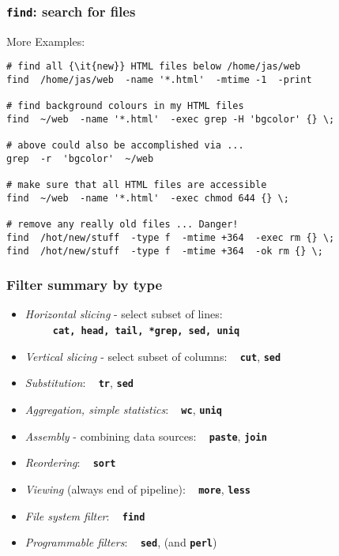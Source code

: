 \begin{frame}[fragile]
\frametitle{\textbf{\tt{find}}: search for files}
More Examples:
\begin{verbatim}
# find all {\it{new}} HTML files below /home/jas/web
find  /home/jas/web  -name '*.html'  -mtime -1  -print

# find background colours in my HTML files
find  ~/web  -name '*.html'  -exec grep -H 'bgcolor' {} \;

# above could also be accomplished via ...
grep  -r  'bgcolor'  ~/web

# make sure that all HTML files are accessible
find  ~/web  -name '*.html'  -exec chmod 644 {} \;

# remove any really old files ... Danger!
find  /hot/new/stuff  -type f  -mtime +364  -exec rm {} \;
find  /hot/new/stuff  -type f  -mtime +364  -ok rm {} \;
\end{verbatim}

\end{frame}

\begin{frame}[shrink]
\frametitle{Filter summary by type}
\begin{itemize}
\item {\em{Horizontal slicing}} - select subset of lines: \\
	~ ~ ~ \textbf{\tt{cat, head, tail, *grep, sed, uniq}}
\item {\em{Vertical slicing}} - select subset of columns:
	~ \textbf{\tt{cut}}, \textbf{\tt{sed}}
\item {\em{Substitution}}:
	~ \textbf{\tt{tr}}, \textbf{\tt{sed}} 
\item {\em{Aggregation, simple statistics}}:
	~ \textbf{\tt{wc}}, \textbf{\tt{uniq}} 
\item {\em{Assembly}} - combining data sources:
	~ \textbf{\tt{paste}}, \textbf{\tt{join}} 
\item {\em{Reordering}}:
	~ \textbf{\tt{sort}} 
\item {\em{Viewing}} (always end of pipeline):
	~ \textbf{\tt{more}}, \textbf{\tt{less}} 
\item {\em{File system filter}}:
	~ \textbf{\tt{find}} 
\item {\em{Programmable filters}}:
	~ \textbf{\tt{sed}}, (and \textbf{\tt{perl}})
\end{itemize}
\end{frame}


